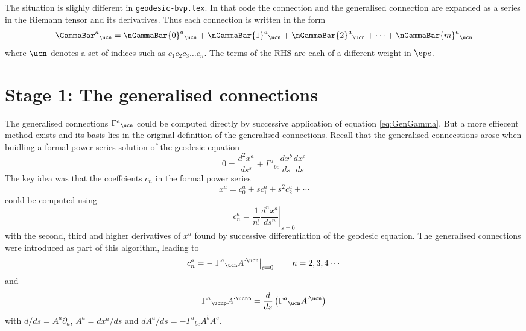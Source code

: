 \documentclass[12pt]{cdblatex}
\begin{document}
The situation is slighly different in {\tt geodesic-bvp.tex}. In that code the connection and the generalised
connection are expanded as a series in the Riemann tensor and its derivatives. Thus each connection is written
in the form
\begin{align}
   {\GammaBar}^{a}{}_{\ucn }
      = \nGammaBar{0}^{a}{}_{\ucn}
      + \nGammaBar{1}^{a}{}_{\ucn}
      + \nGammaBar{2}^{a}{}_{\ucn}
      + \dots
      + \nGammaBar{m}^{a}{}_{\ucn}
\end{align}
where $\ucn$ denotes a set of indices such as $c_1c_2c_3\dots c_n$. The terms of the RHS are each of a different
weight in $\eps$.

\section*{Stage 1: The generalised connections}

The generalised connections $\Gamma^{a}{}_{\ucn}$ could be computed directly by successive
application of equation \eqref{eq:GenGamma}. But a more effiecent method exists and its basis
lies in the original definition of the generalised connections. Recall that the generalised
connecstions arose when buidling a formal power series solution of the geodesic equation
\begin{equation}
   0 = \frac{d^2 x^{a}}{ds^s} + \Gamma^{a}{}_{bc} \frac{dx^{b}}{ds} \frac{dx^{c}}{ds}
\end{equation}
The key idea was that the coeffcients $c_n$ in the formal power series
\begin{equation}
   x^{a} = c^a_0 + s c^a_1 + s^2 c^a_2 + \cdots
\end{equation}
could be computed using
\begin{equation}
   c^a_n = \frac{1}{n!} \left.\frac{d^n x^{a}}{ds^n}\right\vert_{s=0}
\end{equation}
with the second, third and higher derivatives of $x^{a}$ found by successive differentiation of
the geodesic equation. The generalised connections were introduced as part of this algorithm,
leading to
\begin{equation}
   c^a_n = - \left.\Gamma^{a}{}_{\ucn} A^{\cdot\ucn}\right\vert_{s=0}\qquad n=2,3,4\cdots
\end{equation}
and
\begin{equation}
   \Gamma^{a}{}_{\ucnp} A^{\cdot\ucnp}
   = \frac{d}{ds} \left(\Gamma^{a}{}_{\ucn} A^{\cdot\ucn}\right)
\end{equation}
with $d/ds = A^{a}\partial_{a}$, $A^{a}=dx^{a}/ds$ and
$dA^{a}/ds = - \Gamma^{a}{}_{bc} A^{b} A^{c}$.
\end{document}
